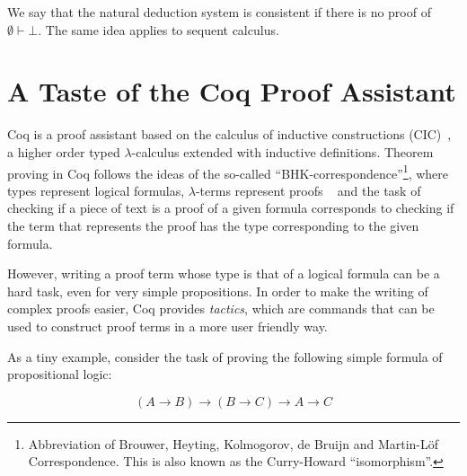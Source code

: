 We say that the natural deduction system is consistent if there is no proof of $\emptyset\vdash \bot$. The same idea applies to sequent calculus.


\section{A Taste of the Coq Proof Assistant}\label{sec:coq}


Coq is a proof assistant based on the calculus of inductive
constructions (CIC)~\cite{Bertot04}, a higher order typed
$\lambda$-calculus extended with inductive definitions.  Theorem
proving in Coq follows the ideas of the so-called
``BHK-correspondence''\footnote{Abbreviation of Brouwer, Heyting,
  Kolmogorov, de Bruijn and Martin-L\"of Correspondence. This is also
  known as the Curry-Howard ``isomorphism''.}, where types represent
logical formulas, $\lambda$-terms represent proofs
~\cite{Sorensen06} and the task of checking if a piece of text is a
proof of a given formula corresponds to checking if the term that
represents the proof has the type corresponding to the given formula.


However, writing a proof term whose type is that of a logical formula
can be a hard task, even for very simple propositions.  In order to
make the writing of complex proofs easier, Coq provides
\emph{tactics}, which are commands that can be used to construct proof
terms in a more user friendly way.


As a tiny example, consider the task of proving the following simple
formula of propositional logic:

\[
(A \to B)\to (B\to C) \to A \to C
\]

